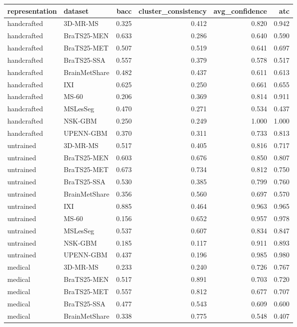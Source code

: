 \begin{tabular}{llrrrr}
\toprule
representation & dataset & bacc & cluster\_consistency & avg\_confidence & atc \\
\midrule
handcrafted & 3D-MR-MS & 0.325 & 0.412 & 0.820 & 0.942 \\
handcrafted & BraTS25-MEN & 0.633 & 0.286 & 0.640 & 0.590 \\
handcrafted & BraTS25-MET & 0.507 & 0.519 & 0.641 & 0.697 \\
handcrafted & BraTS25-SSA & 0.557 & 0.379 & 0.578 & 0.517 \\
handcrafted & BrainMetShare & 0.482 & 0.437 & 0.611 & 0.613 \\
handcrafted & IXI & 0.625 & 0.250 & 0.661 & 0.655 \\
handcrafted & MS-60 & 0.206 & 0.369 & 0.814 & 0.911 \\
handcrafted & MSLesSeg & 0.470 & 0.271 & 0.534 & 0.437 \\
handcrafted & NSK-GBM & 0.250 & 0.249 & 1.000 & 1.000 \\
handcrafted & UPENN-GBM & 0.370 & 0.311 & 0.733 & 0.813 \\
untrained & 3D-MR-MS & 0.517 & 0.405 & 0.816 & 0.717 \\
untrained & BraTS25-MEN & 0.603 & 0.676 & 0.850 & 0.807 \\
untrained & BraTS25-MET & 0.673 & 0.734 & 0.812 & 0.750 \\
untrained & BraTS25-SSA & 0.530 & 0.385 & 0.799 & 0.760 \\
untrained & BrainMetShare & 0.356 & 0.560 & 0.697 & 0.570 \\
untrained & IXI & 0.885 & 0.464 & 0.963 & 0.965 \\
untrained & MS-60 & 0.156 & 0.652 & 0.957 & 0.978 \\
untrained & MSLesSeg & 0.537 & 0.607 & 0.834 & 0.847 \\
untrained & NSK-GBM & 0.185 & 0.117 & 0.911 & 0.893 \\
untrained & UPENN-GBM & 0.437 & 0.196 & 0.985 & 0.980 \\
medical & 3D-MR-MS & 0.233 & 0.240 & 0.726 & 0.767 \\
medical & BraTS25-MEN & 0.517 & 0.891 & 0.703 & 0.720 \\
medical & BraTS25-MET & 0.557 & 0.812 & 0.677 & 0.707 \\
medical & BraTS25-SSA & 0.477 & 0.543 & 0.609 & 0.600 \\
medical & BrainMetShare & 0.338 & 0.775 & 0.548 & 0.407 \\

\end{tabular}
